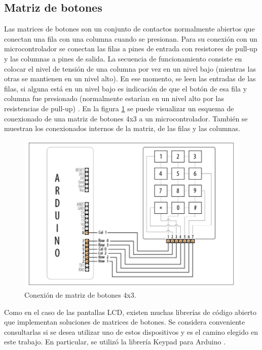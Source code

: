 
\subsection{Matriz de botones}
\label{teclado}
Las matrices de botones son un conjunto de contactos normalmente abiertos que conectan una fila con una columna cuando se presionan. Para su conexión con un microcontrolador se conectan las filas a pines de entrada con resistores de pull-up y las columnas a pines de salida. La secuencia de funcionamiento consiste en colocar el nivel de tensión de una columna por vez en un nivel bajo (mientras las otras se mantienen en un nivel alto). En ese momento, se leen las entradas de las filas, si alguna está en un nivel bajo es indicación de que el botón de esa fila y columna fue presionado (normalmente estarían en un nivel alto por las resistencias de pull-up) \citep{Arduino_Cookbook}. En la figura \ref{fig:but_matrix} \citep{Arduino_Cookbook} se puede visualizar un esquema de conexionado de una matriz de botones 4x3 a un microcontrolador. También se muestran los conexionados internos de la matriz, de las filas y las columnas.

\begin{figure}[htbp]
	\centering
	\includegraphics[scale=.6]{./Figures/But_Matrix.JPG}
	\caption{Conexión de matriz de botones 4x3.}
	\label{fig:but_matrix}
\end{figure}

Como en el caso de las pantallas LCD, existen muchas librerías de código abierto que implementan soluciones de matrices de botones. Se considera conveniente consultarlas si se desea utilizar uno de estos dispositivos y es el camino elegido en este trabajo. En particular, se utilizó la librería Keypad para Arduino \citep{web_repo_keypad}.

